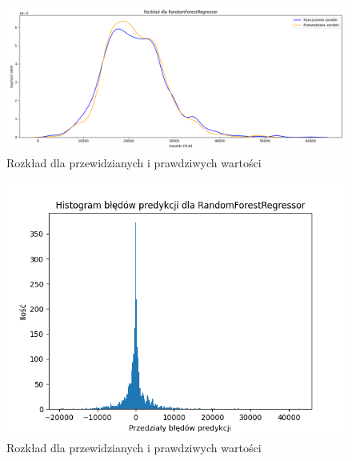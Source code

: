 \documentclass[a4paper]{article}
\begin{document}
\begin{figure}[H]
    \centering
    \includegraphics[width=\textwidth]{../analysis/plots/wyniki/0.6&0.4/RandomForestRegressor/salary_dist.png}
    \caption{Rozkład dla przewidzianych i prawdziwych wartości}
\end{figure}

\begin{figure}[H]
    \centering
    \includegraphics[width=\textwidth]{../analysis/plots/wyniki/0.6&0.4/RandomForestRegressor/errors.png}
    \caption{Rozkład dla przewidzianych i prawdziwych wartości}
\end{figure}
\end{document}
